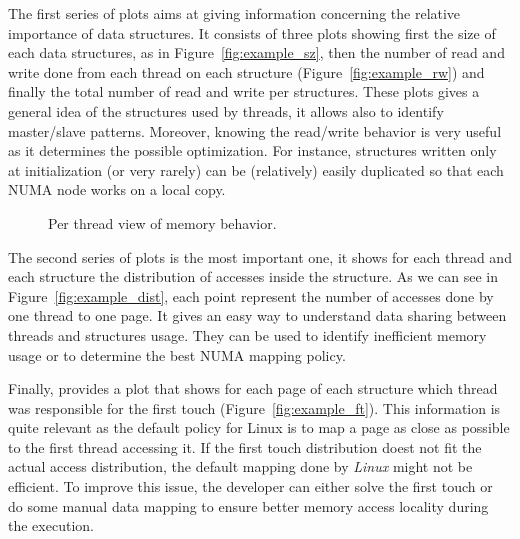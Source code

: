 The first series of plots aims at giving information concerning the relative
importance of data structures. It consists of three plots showing first the
size of  each data structures, as in Figure~\ref{fig:example_sz}, then the
number of read and write done from each thread on each structure (Figure~\ref{fig:example_rw}) and
finally the total number of read and write per structures. These plots gives a
general idea of the structures used by threads, it allows also to identify
master/slave patterns.  Moreover, knowing the read/write behavior is very
useful as it determines the possible optimization. For instance, structures
written only at initialization (or very rarely) can be (relatively) easily
duplicated so that each NUMA node works on a local copy.

\begin{figure}[htb]
    \centering
    \caption{Per thread view of memory behavior.}
    \label{fig:example_plot2}
\end{figure}

The second series of plots is the most important one, it shows for each thread
and each structure the distribution of accesses inside the structure. As we
can see in Figure~\ref{fig:example_dist}, each point represent the number of
accesses done by one thread to one page. It gives an easy way to understand data
sharing between threads and structures usage. They can be used to identify
inefficient memory usage or to determine the best NUMA mapping policy.



Finally, \TABARNAC provides a plot that shows for each page of each structure
which thread was responsible for the first touch
(Figure~\ref{fig:example_ft}). This information is quite relevant as the
default policy for Linux is to map a page as close as possible to the first
thread accessing it. If the first touch distribution doest not fit the actual
access distribution, the default mapping done by \emph{Linux} might not be
efficient.  To improve this issue, the developer can either solve the first
touch or do some manual data mapping to ensure better memory access locality
during the execution.
